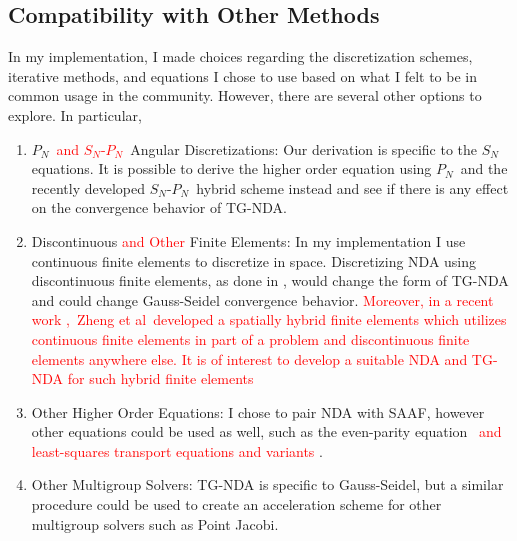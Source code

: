\subsection{Compatibility with Other Methods}
In my implementation, I made choices regarding the discretization schemes, iterative methods, and equations I chose to use based on what I felt to be in common usage in the community. However, there are several other options to explore. In particular, 
\begin{enumerate}
\item $P_N$\ \textcolor{red}{and $S_N$-$P_N$}\ Angular Discretizations:
Our derivation is specific to the $S_N$ equations. It is possible to derive the higher order equation using $P_N$\ and the recently developed $S_N$-$P_N$\ hybrid scheme instead \cite{yaqi-wang-snpn,zheng-thesis,zheng-inl-report} and see if there is any effect on the convergence behavior of TG-NDA.
\item Discontinuous \textcolor{red}{and Other} Finite Elements:
In my implementation I use continuous finite elements to discretize in space. Discretizing NDA using discontinuous finite elements, as done in \cite{Schunert2017}, would change the form of TG-NDA and could change Gauss-Seidel convergence behavior. \textcolor{red}{Moreover, in a recent work \cite{zheng-ans17},\ Zheng et al\ developed a spatially hybrid finite elements which utilizes continuous finite elements in part of a problem and discontinuous finite elements anywhere else. It is of interest to develop a suitable NDA and TG-NDA for such hybrid finite elements}
\item Other Higher Order Equations:
I chose to pair NDA with SAAF, however other equations could be used as well, such as the even-parity equation \cite{Noh1996}\ \textcolor{red}{and least-squares transport equations and variants \cite{morel-holo,zheng-lspn,zheng-cdls}}.
\item Other Multigroup Solvers:
TG-NDA is specific to Gauss-Seidel, but a similar procedure could be used to create an acceleration scheme for other multigroup solvers such as Point Jacobi.
\end{enumerate}

